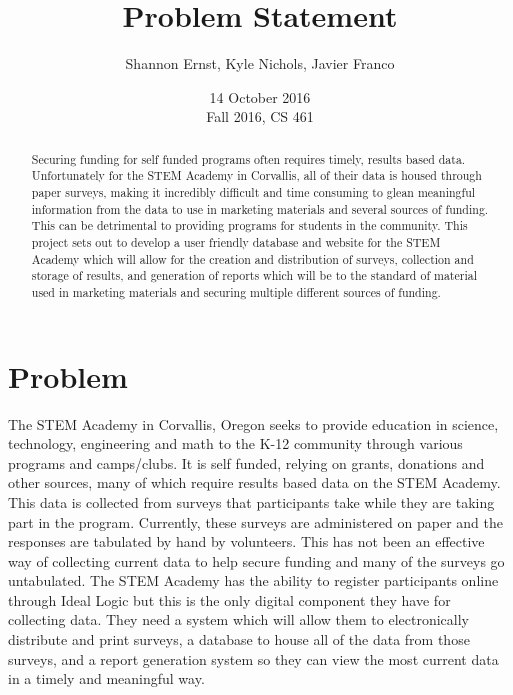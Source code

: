 \documentclass[draftclsnofoot,onecolumn,notitlepage]{article}
\title{Problem Statement}
\author{Shannon Ernst, Kyle Nichols, Javier Franco}
\date{14 October 2016 \\ Fall 2016, CS 461}
\begin{document}
\begin{titlingpage}
\maketitle
\begin{abstract}
Securing funding for self funded programs often requires timely, results based data. Unfortunately for the STEM Academy in Corvallis, all of their data is housed through paper surveys, making it incredibly difficult and time consuming to glean meaningful information from the data to use in marketing materials and several sources of funding. This can be detrimental to providing programs for students in the community. This project sets out to develop a user friendly database and website for the STEM Academy which will allow for the creation and distribution of surveys, collection and storage of results, and generation of reports which will be to the standard of material used in marketing materials and securing multiple different sources of funding.
\end{abstract}
\end{titlingpage}
\section{Problem}
The STEM Academy in Corvallis, Oregon seeks to provide education in science, technology, engineering and math to the K-12 community through various programs and camps/clubs. It is self funded, relying on grants, donations and other sources, many of which require results based data on the STEM Academy. This data is collected from surveys that participants take while they are taking part in the program. Currently, these surveys are administered on paper and the responses are tabulated by hand by volunteers. This has not been an effective way of collecting current data to help secure funding and many of the surveys go untabulated. The STEM Academy has the ability to register participants online through Ideal Logic but this is the only digital component they have for collecting data. They need a system which will allow them to electronically distribute and print surveys, a database to house all of the data from those surveys, and a report generation system so they can view the most current data in a timely and meaningful way.
\end{document}
